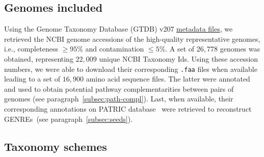 \documentclass[sn-mathphys,Numbered]{sn-jnl}  %
\theoremstyle{thmstyleone}%
\theoremstyle{thmstyletwo}%
\theoremstyle{thmstylethree}%
\begin{document}
    \subsection*{Genomes included}
    \label{subsec:genomes}

        Using the Genome Taxonomy Database (GTDB) v207 \href{https://data.gtdb.ecogenomic.org/releases/release207/207.0/}{metadata files}, we retrieved the NCBI genome accessions of the high-quality representative genomes, i.e., completeness $\geq 95\%$  and contamination $\leq 5\%$.
        A set of $26,778$ genomes was obtained, representing $22,009$ unique NCBI Taxonomy Ids.
        Using these accession numbers, we were able to download their corresponding \texttt{.faa} files when available 
        leading to a set of $16,900$ amino acid sequence files.
        The latter were annotated and used to obtain potential pathway complementarities between pairs of genomes (see paragraph~\ref{subsec:path-compl}).
        Last, when available, their corresponding annotations on PATRIC database~\cite{wattam2017improvements} were retrieved to reconstruct GENREs~(see paragraph~\ref{subsec:seeds}).


    \subsection*{Taxonomy schemes}
    \label{subsec:taxonomies}
\end{document}
